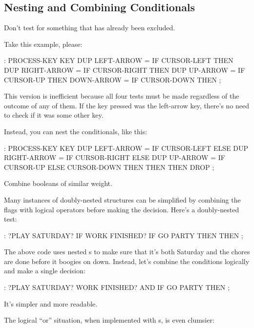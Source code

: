 \subsection{Nesting and Combining Conditionals}%
%
%
\begin{tip}
Don't test for something that has already been excluded.
\end{tip}
Take this example, please:

\begin{Code}
: PROCESS-KEY
   KEY  DUP  LEFT-ARROW  =  IF CURSOR-LEFT  THEN
        DUP  RIGHT-ARROW =  IF CURSOR-RIGHT THEN
        DUP  UP-ARROW    =  IF CURSOR-UP    THEN
             DOWN-ARROW  =  IF CURSOR-DOWN  THEN ;
\end{Code}
This version is inefficient because all four tests must be made regardless
of the outcome of any of them. If the key pressed was the left-arrow key,
there's no need to check if it was some other key.

Instead, you can nest the conditionals, like this:

\begin{Code}
: PROCESS-KEY
   KEY  DUP  LEFT-ARROW  =  IF CURSOR-LEFT  ELSE
        DUP  RIGHT-ARROW =  IF CURSOR-RIGHT ELSE
        DUP  UP-ARROW    =  IF CURSOR-UP    ELSE
                               CURSOR-DOWN
           THEN THEN THEN  DROP ;
\end{Code}
\begin{tip}
Combine booleans of similar weight.
\end{tip}
Many instances of doubly-nested  structures can
be simplified by combining the flags with logical operators before making
the decision.
Here's a doubly-nested test:
\begin{Code}
: ?PLAY   SATURDAY? IF  WORK FINISHED? IF
     GO PARTY  THEN  THEN ;
\end{Code}
The above code uses nested s to make sure that it's both
Saturday and the chores are done before it boogies on down. Instead,
let's combine the conditions logically and make a single decision:

\begin{Code}
: ?PLAY   SATURDAY?  WORK FINISHED? AND  IF
   GO PARTY  THEN ;
\end{Code}
It's simpler and more readable.

The logical ``or'' situation, when implemented with
s, is even clumsier:

